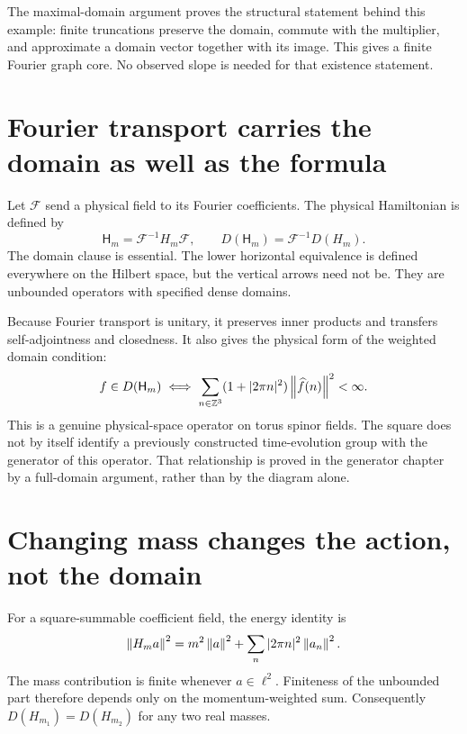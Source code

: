 The maximal-domain argument proves the structural statement behind this example: finite truncations preserve the domain, commute with the multiplier, and approximate a domain vector together with its image. This gives a finite Fourier graph core. No observed slope is needed for that existence statement.


\clearpage
\section{Fourier transport carries the domain as well as the formula}

Let $\mathcal F$ send a physical field to its Fourier coefficients. The physical Hamiltonian is defined by
\[
\mathsf H_m=\mathcal F^{-1}H_m\mathcal F,
\qquad
D(\mathsf H_m)=\mathcal F^{-1}D(H_m).
\]
The domain clause is essential. The lower horizontal equivalence is defined everywhere on the Hilbert space, but the vertical arrows need not be. They are unbounded operators with specified dense domains.

Because Fourier transport is unitary, it preserves inner products and transfers self-adjointness and closedness. It also gives the physical form of the weighted domain condition:
\[
f\in D(\mathsf H_m)
\iff \sum_{n\in\mathbb Z^3}(1+|2\pi n|^2)\left\lVert\widehat f(n)\right\rVert^2<\infty.
\]
This is a genuine physical-space operator on torus spinor fields. The square does not by itself identify a previously constructed time-evolution group with the generator of this operator. That relationship is proved in the generator chapter by a full-domain argument, rather than by the diagram alone.


\clearpage
\section{Changing mass changes the action, not the domain}

For a square-summable coefficient field, the energy identity is
\[
\left\lVert H_ma\right\rVert^2=m^2\left\lVert a\right\rVert^2+
\sum_n|2\pi n|^2\left\lVert a_n\right\rVert^2.
\]
The mass contribution is finite whenever $a\in\ell^2$. Finiteness of the unbounded part therefore depends only on the momentum-weighted sum. Consequently $D(H_{m_1})=D(H_{m_2})$ for any two real masses.

